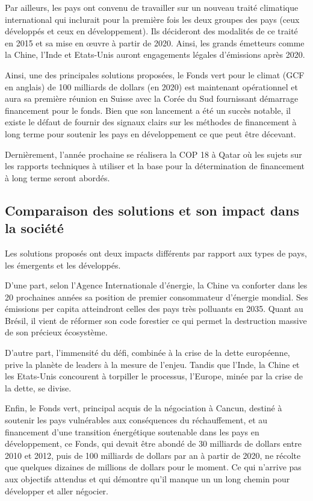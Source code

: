 \documentclass[a4paper,10pt]{article}
\begin{document}
Par  ailleurs,  les  pays  ont  convenu  de travailler  sur  un  nouveau  traité
climatique international  qui inclurait pour  la première fois les  deux groupes
des  pays  (ceux  développés  et  ceux en  développement).  Ils  décideront  des
modalités de ce traité en 2015 et sa  mise en œuvre à partir de 2020. Ainsi, les
grands émetteurs comme la Chine, l'Inde et Etats-Unis auront engagements légales
d'émissions après 2020. 


Ainsi, une  des principales  solutions proposées, le  Fonds vert pour  le climat
(GCF  en  anglais)  de  100  milliards  de  dollars  (en  2020)  est  maintenant
opérationnel  et  aura sa  première  réunion  en Suisse  avec  la  Corée du  Sud
fournissant démarrage financement pour le fonds. Bien que son lancement a été un
succès  notable, il  existe le  défaut  de fournir  des signaux  clairs sur  les
méthodes de financement à long terme  pour soutenir les pays en développement ce
que peut être décevant. 


Dernièrement, l’année prochaine se réalisera la COP 18 à Qatar où les sujets sur
les  rapports  techniques  à  utiliser  et  la base  pour  la  détermination  de
financement à long terme seront abordés.


\subsection{Comparaison des solutions et son impact dans la société}

Les solutions proposés ont deux impacts différents par rapport aux types de pays, les émergents et les développés.

D’une part, selon l'Agence Internationale  d'énergie, la Chine va conforter dans
les  20  prochaines  années   sa  position  de  premier  consommateur  d'énergie
mondial. Ses émissions per capita  atteindront celles des pays très polluants en
2035. Quant au Brésil, il vient de  réformer son code forestier ce qui permet la
destruction massive de son précieux écosystème. 


D’autre part, l'immensité  du défi, combinée à la crise  de la dette européenne,
prive la planète de leaders à la  mesure de l'enjeu. Tandis que l'Inde, la Chine
et les  Etats-Unis concourent à torpiller  le processus, l'Europe,  minée par la
crise de la dette, se divise. 


Enfin, le  Fonds vert, principal  acquis de la  négociation à Cancun,  destiné à
soutenir  les  pays  vulnérables   aux  conséquences  du  réchauffement,  et  au
financement   d'une  transition   énergétique  soutenable   dans  les   pays  en
développement, ce Fonds, qui devait être abondé de 30 milliards de dollars entre
2010 et  2012, puis  de 100 milliards  de dollars  par an à  partir de  2020, ne
récolte que  quelques dizaines  de millions  de dollars pour  le moment.  Ce qui
n’arrive pas  aux objectifs  attendus et  qui démontre qu’il  manque un  un long
chemin pour développer et aller négocier.
\end{document}
